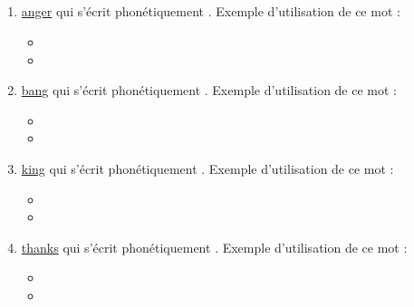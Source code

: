 \subsection{}\label{sec:ing}

\begin{enumerate}
\item \href{http://www.wordreference.com/enfr/anger}{anger} qui s'écrit phonétiquement \href{https://en.oxforddictionaries.com/definition/anger}{}. Exemple d'utilisation de
ce mot : 

\begin{itemize}
\item{}
\item{}
\end{itemize}

\item \href{http://www.wordreference.com/enfr/bang}{bang} qui s'écrit phonétiquement \href{https://en.oxforddictionaries.com/definition/bang}{}. Exemple d'utilisation de ce
  mot :
  
\begin{itemize}
\item{}
\item{}
\end{itemize}

\item \href{http://www.wordreference.com/enfr/king}{king} qui s'écrit phonétiquement \href{https://en.oxforddictionaries.com/definition/king}{}. Exemple d'utilisation de ce
mot : 

\begin{itemize}
\item{}
\item{}
\end{itemize}

\item \href{http://www.wordreference.com/enfr/thanks}{thanks} qui s'écrit phonétiquement \href{https://en.oxforddictionaries.com/definition/thanks}{}. Exemple d'utilisation de
  ce mot :
  
\begin{itemize}
\item{}
\item{}
\end{itemize}

\end{enumerate}

